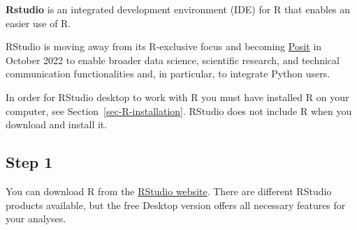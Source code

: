 \documentclass[
  letterpaper,
  DIV=11,
  numbers=noendperiod,
  oneside]{scrreprt}
\begin{document}
\textbf{Rstudio} is an integrated development environment (IDE) for R
that enables an easier use of R.

\begin{tcolorbox}[enhanced jigsaw, coltitle=black, opacityback=0, title=\textcolor{quarto-callout-note-color}{\faInfo}\hspace{0.5em}{Note}, toprule=.15mm, bottomtitle=1mm, colbacktitle=quarto-callout-note-color!10!white, colframe=quarto-callout-note-color-frame, left=2mm, opacitybacktitle=0.6, bottomrule=.15mm, arc=.35mm, toptitle=1mm, colback=white, titlerule=0mm, breakable, leftrule=.75mm, rightrule=.15mm]

RStudio is moving away from its R-exclusive focus and becoming
\href{https://posit.co/}{Posit} in October 2022 to enable broader data
science, scientific research, and technical communication
functionalities and, in particular, to integrate Python users.

\end{tcolorbox}

\begin{tcolorbox}[enhanced jigsaw, coltitle=black, opacityback=0, title=\textcolor{quarto-callout-important-color}{\faExclamation}\hspace{0.5em}{Important}, toprule=.15mm, bottomtitle=1mm, colbacktitle=quarto-callout-important-color!10!white, colframe=quarto-callout-important-color-frame, left=2mm, opacitybacktitle=0.6, bottomrule=.15mm, arc=.35mm, toptitle=1mm, colback=white, titlerule=0mm, breakable, leftrule=.75mm, rightrule=.15mm]

In order for RStudio desktop to work with R you must have installed R on
your computer, see Section~\ref{sec-R-installation}. RStudio does not
include R when you download and install it.

\end{tcolorbox}

\subsection{Step 1}

You can download R from the
\href{https://www.rstudio.com/products/rstudio/download/}{RStudio
website}. There are different RStudio products available, but the free
Desktop version offers all necessary features for your analyses.
\end{document}
